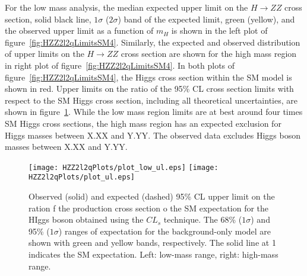 For the low
mass analysis, the median expected upper limit on the $H\to ZZ$ 
cross section, solid black line, $1\sigma$ ($2\sigma$) band of 
the expected limit, green (yellow), and the observed upper limit 
as a function of $m_H$ is shown in the left plot of 
figure~\ref{fig:HZZ2l2qLimitsSM4}.  Similarly, the expected and 
observed distribution of upper limits on the $H\to ZZ$ cross 
section are shown for the high mass region in right plot of 
figure~\ref{fig:HZZ2l2qLimitsSM4}.  In both plots of 
figure~\ref{fig:HZZ2l2qLimitsSM4}, the Higgs cross section
within the SM model is shown in red.  
Upper limits on the ratio of the 95\% CL cross section limits 
with respect to the SM Higgs cross section, including all 
theoretical uncertainties, are shown in 
figure~\ref{fig:HZZ2l2qLimits}.  While the low mass region
limits are at best around four times SM Higgs cross sections, 
the high mass region has an expected exclusion for Higgs masses 
between X.XX and Y.YY. The observed data excludes Higgs boson 
masses between X.XX and Y.YY.

\begin{figure}
\begin{center}
\texttt{[image: HZZ2l2qPlots/plot\_low\_ul.eps]}
\texttt{[image: HZZ2l2qPlots/plot\_ul.eps]}
\caption{Observed (solid) and expected (dashed) 95\% CL upper limit on
the ration f the production cross section o the SM expectation for the 
HIggs boson obtained using the $CL_s$ technique.  The 68\% ($1\sigma$) 
and 95\% ($1\sigma$) ranges of expectation for the background-only model
are shown with green and yellow bands, respectively.  The solid line at 
1 indicates the SM expectation.  Left: low-mass range, right: high-mass
range. }
\label{fig:HZZ2l2qLimits}
\end{center}
\end{figure}


